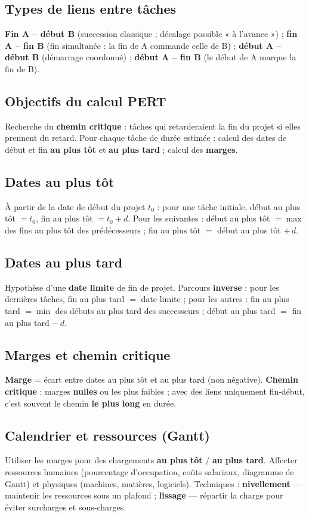\documentclass[11pt,a4paper]{article}
\begin{document}
\subsection{Types de liens entre tâches}
\textbf{Fin A -- début B} (succession classique ; décalage possible « à l'avance ») ; \textbf{fin A -- fin B} (fin simultanée : la fin de A commande celle de B) ; \textbf{début A -- début B} (démarrage coordonné) ; \textbf{début A -- fin B} (le début de A marque la fin de B).

\subsection{Objectifs du calcul PERT}
Recherche du \textbf{chemin critique} : tâches qui retarderaient la fin du projet si elles prennent du retard. Pour chaque tâche de durée estimée : calcul des dates de début et fin \textbf{au plus tôt} et \textbf{au plus tard} ; calcul des \textbf{marges}.

\subsection{Dates au plus tôt}
À partir de la date de début du projet $t_0$ : pour une tâche initiale, début au plus tôt $= t_0$, fin au plus tôt $= t_0 + d$. Pour les suivantes : début au plus tôt $= \max$ des fins au plus tôt des prédécesseurs ; fin au plus tôt $=$ début au plus tôt $+\,d$.

\subsection{Dates au plus tard}
Hypothèse d'une \textbf{date limite} de fin de projet. Parcours \textbf{inverse} : pour les dernières tâches, fin au plus tard $=$ date limite ; pour les autres : fin au plus tard $= \min$ des débuts au plus tard des successeurs ; début au plus tard $=$ fin au plus tard $-\,d$.

\subsection{Marges et chemin critique}
\textbf{Marge} = écart entre dates au plus tôt et au plus tard (non négative). \textbf{Chemin critique} : marges \textbf{nulles} ou les plus faibles ; avec des liens uniquement fin-début, c'est souvent le chemin \textbf{le plus long} en durée.

\subsection{Calendrier et ressources (Gantt)}
Utiliser les marges pour des chargements \textbf{au plus tôt} / \textbf{au plus tard}. Affecter ressources humaines (pourcentage d'occupation, coûts salariaux, diagramme de Gantt) et physiques (machines, matières, logiciels). Techniques : \textbf{nivellement} — maintenir les ressources sous un plafond ; \textbf{lissage} — répartir la charge pour éviter surcharges et sous-charges.
\end{document}
